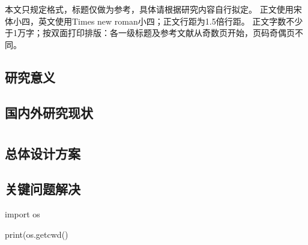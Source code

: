 \setcounter{section}{0}

\cleardoublepage
\section{} %
\label{sec:引言}
	
	本文只规定格式，标题仅做为参考，具体请根据研究内容自行拟定。
	正文使用宋体小四，英文使用Times new roman小四；正文行距为1.5倍行距。
	正文字数不少于1万字；按双面打印排版：各一级标题及参考文献从奇数页开始，页码奇偶页不同。

	\subsection{研究意义} %
	\label{sub:研究意义}

	\newpage

	\subsection{国内外研究现状} %
	\label{sub:国内外研究现状}


\cleardoublepage
\section{} %
\label{sec:系统设计方案}
	\subsection{总体设计方案} %
	\label{sub:总体设计方案}
	
	\newpage

	\subsection{关键问题解决} %
	\label{sub:关键问题解决}
	
\begin{python}
import os


print(os.getcwd()
\end{python}

